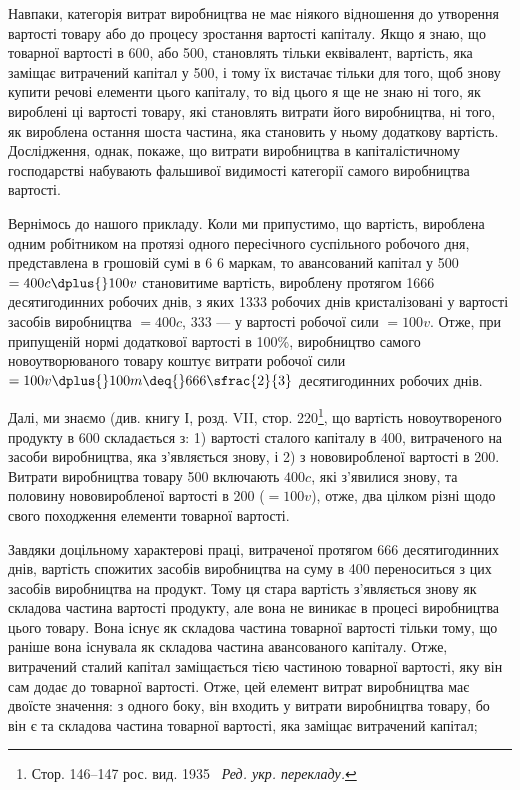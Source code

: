 
Навпаки, категорія витрат виробництва не має ніякого відношення
до утворення вартості товару або до процесу зростання
вартості капіталу. Якщо я знаю, що  товарної вартості
в 600, або 500, становлять
тільки еквівалент, вартість, яка заміщає витрачений капітал
у 500, і тому їх вистачає тільки для того, щоб
знову купити речові елементи цього капіталу, то від цього
я ще не знаю ні того, як вироблені ці   вартості товару, які
становлять витрати його виробництва, ні того, як вироблена
остання шоста частина, яка становить у ньому додаткову вартість.
Дослідження, однак, покаже, що витрати виробництва в капіталістичному
господарстві набувають фальшивої видимості категорії
самого виробництва вартості.

Вернімось до нашого прикладу. Коли ми припустимо, що вартість,
вироблена одним робітником на протязі одного пересічного
суспільного робочого дня, представлена в грошовій сумі
в 6 \deq{} 6 маркам, то авансований капітал у 500 $= 400 c \dplus{} 100 v$ становитиме вартість, вироблену протягом
1666 десятигодинних робочих днів, з яких 1333 робочих
днів кристалізовані у вартості засобів виробництва $= 400 c$,
333  — у вартості робочої сили $= 100v$. Отже, при припущеній
нормі додаткової вартості в 100\%, виробництво самого новоутворюваного
товару коштує витрати робочої сили $= 100v \dplus{} 100m \deq{} 666\sfrac{2}{3}$ десятигодинних робочих днів.

Далі, ми знаємо (див. книгу І, розд. VII, стор. 220\footnote*{Стор. 146--147 рос. вид. 1935~ \emph{Ред. укр. перекладу.}}, що вартість
новоутвореного продукту в 600 складається
з: 1) вартості сталого капіталу в 400,
витраченого на засоби виробництва, яка з’являється знову, і
2) з нововиробленої вартості в 200. Витрати
виробництва товару \deq{} 500 включають $400 c$,
які з’явилися знову, та половину нововиробленої вартості в
200 ($= 100 v$), отже, два цілком різні щодо
свого походження елементи товарної вартості.

Завдяки доцільному характерові праці, витраченої протягом
666  десятигодинних днів, вартість спожитих засобів виробництва
на суму в 400 переноситься з цих
засобів виробництва на продукт. Тому ця стара вартість з’являється
знову як складова частина вартості продукту, але вона
не виникає в процесі виробництва цього товару. Вона існує як
складова частина товарної вартості тільки тому, що раніше вона
існувала як складова частина авансованого капіталу. Отже, витрачений
сталий капітал заміщається тією частиною товарної
вартості, яку він сам додає до товарної вартості. Отже, цей
елемент витрат виробництва має двоїсте значення: з одного боку,
він входить у витрати виробництва товару, бо він є та складова
частина товарної вартості, яка заміщає витрачений капітал;
\parbreak{}  %
